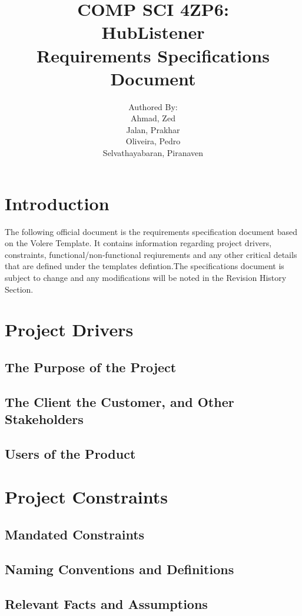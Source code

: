 \documentclass{article}
\title{COMP SCI 4ZP6:\\ \textbf{HubListener}\\ Requirements Specifications Document}
\author{ Authored By:
		\\ Ahmad, Zed
		\\ Jalan, Prakhar 
		\\ Oliveira, Pedro
		\\ Selvathayabaran, Piranaven
}
\date{}
\begin{document}
\newpage

\maketitle

\newpage
\tableofcontents {}

\section{Introduction}

The following official document is the requirements specification document based on the Volere Template. It contains information regarding project drivers, constraints, functional/non-functional reqiurements and  any other critical details that are defined under the templates defintion.The specifications document is subject to change and any modifications will be noted in the Revision History Section. 
\newpage
\section{Project Drivers}


\subsection{The Purpose of the Project}
\subsection{The Client the Customer, and Other Stakeholders}
\subsection{Users of the Product}



\newpage
\section{Project Constraints}


\subsection{Mandated Constraints}
\subsection{Naming Conventions and Definitions}
\subsection{Relevant Facts and Assumptions}
\end{document}
